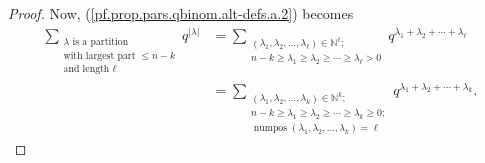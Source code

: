 \begin{proof}
Now, (\ref{pf.prop.pars.qbinom.alt-defs.a.2}) becomes%
\begin{align}
\sum_{\substack{\lambda\text{ is a partition}\\\text{with largest part }\leq
n-k\\\text{and length }\ell}}q^{\left\vert \lambda\right\vert }  &
=\sum_{\substack{\left(  \lambda_{1},\lambda_{2},\ldots,\lambda_{\ell}\right)
\in\mathbb{N}^{\ell};\\n-k\geq\lambda_{1}\geq\lambda_{2}\geq\cdots\geq
\lambda_{\ell}>0}}q^{\lambda_{1}+\lambda_{2}+\cdots+\lambda_{\ell}}\nonumber\\
&  =\sum_{\substack{\left(  \lambda_{1},\lambda_{2},\ldots,\lambda_{k}\right)
\in\mathbb{N}^{k};\\n-k\geq\lambda_{1}\geq\lambda_{2}\geq\cdots\geq\lambda
_{k}\geq0;\\\operatorname*{numpos}\left(  \lambda_{1},\lambda_{2}%
,\ldots,\lambda_{k}\right)  =\ell}}q^{\lambda_{1}+\lambda_{2}+\cdots
+\lambda_{k}}. \label{pf.prop.pars.qbinom.alt-defs.a.5}%
\end{align}



\end{proof}
